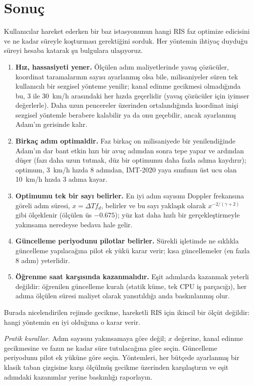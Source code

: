 \section{Sonuç}
\label{sec:conclusion}

Kullanıcılar hareket ederken bir baz istasyonunun hangi RIS faz optimize edicisini ve ne kadar süreyle koşturması gerektiğini sorduk. Her yöntemin ihtiyaç duyduğu süreyi hesaba katarak şu bulgulara ulaşıyoruz.
\begin{enumerate}
    \item \textbf{Hız, hassasiyeti yener.} Ölçülen adım maliyetlerinde yavaş çözücüler, koordinat taramalarının sayısı ayarlanmış olsa bile, milisaniyeler süren tek kullanıcılı bir sezgisel yönteme yenilir; kanal edinme gecikmesi olmadığında bu, 3 ile 30~km/h arasındaki her hızda geçerlidir (yavaş çözücüler için iyimser değerlerle). Daha uzun pencereler üzerinden ortalandığında koordinat inişi sezgisel yöntemle berabere kalabilir ya da onu geçebilir, ancak ayarlanmış Adam'ın gerisinde kalır.
    \item \textbf{Birkaç adım optimaldir.} Faz birkaç on milisaniyede bir yenilendiğinde Adam'ın dar bant etkin hızı bir avuç adımdan sonra tepe yapar ve ardından düşer (fazı daha uzun tutmak, düz bir optimumu daha fazla adıma kaydırır); optimum, 3~km/h hızda 8 adımdan, IMT-2020 yaya sınıfının üst ucu olan 10~km/h hızda 3 adıma kayar.
    \item \textbf{Optimumu tek bir sayı belirler.} En iyi adım sayısını Doppler frekansına göreli adım süresi, $x=\Delta T f_d$, belirler ve bu sayı yaklaşık olarak $x^{-2/(\gamma+2)}$ gibi ölçeklenir (ölçülen üs $-0.675$); yüz kat daha hızlı bir gerçekleştirmeyle yakınsama neredeyse bedava hale gelir.
    \item \textbf{Güncelleme periyodunu pilotlar belirler.} Sürekli işletimde ne sıklıkla güncelleme yapılacağına pilot ek yükü karar verir; kısa güncellemeler (en fazla 8 adım) yeterlidir.
    \item \textbf{Öğrenme saat karşısında kazanmalıdır.} Eşit adımlarda kazanmak yeterli değildir: öğrenilen güncelleme kuralı (statik küme, tek CPU iş parçacığı), her adıma ölçülen süresi maliyet olarak yansıtıldığı anda baskınlanmış olur.
\end{enumerate}
Burada nicelendirilen rejimde gecikme, hareketli RIS için ikincil bir ölçüt değildir: hangi yöntemin en iyi olduğuna o karar verir.

\emph{Pratik kurallar.} Adım sayısını yakınsamaya göre değil; $x$ değerine, kanal edinme gecikmesine ve fazın ne kadar süre tutulacağına göre seçin. Güncelleme periyodunu pilot ek yüküne göre seçin. Yöntemleri, her bütçede ayarlanmış bir klasik taban çizgisine karşı ölçülmüş gecikme üzerinden karşılaştırın ve eşit adımdaki kazanımlar yerine baskınlığı raporlayın.

